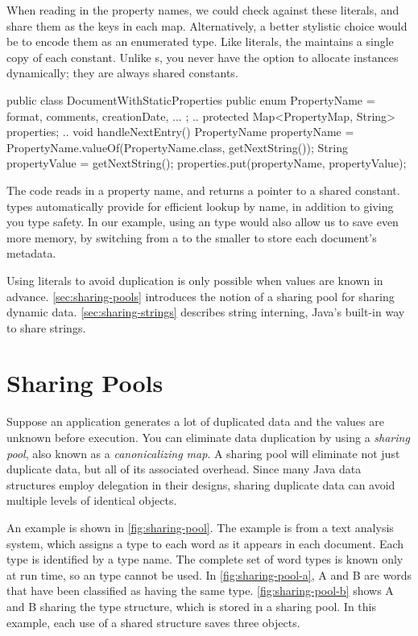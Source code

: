 When reading in the property names, we could check against these
literals, and share them as the keys in each map. 
Alternatively, a better stylistic choice would be to encode them as an
enumerated type. Like  literals, the \jre maintains a
single copy of each  constant. Unlike s,
you never have the option to allocate  instances dynamically; they
are always shared constants. 

\begin{shortlisting}
	public class DocumentWithStaticProperties {
		public enum PropertyName = 
			{format, comments, creationDate, ... };
		..
		protected Map<PropertyMap, String> properties; 
		..
		void handleNextEntry() {
			PropertyName propertyName = 
				PropertyName.valueOf(PropertyName.class, getNextString()); 
			String propertyValue = getNextString(); 
			properties.put(propertyName, propertyValue); }
	}
\end{shortlisting}

The code reads in a property name, and returns a pointer to a shared 
constant.  types automatically provide for
efficient lookup by name, in addition to giving you type safety. In our
example, using an  type would also allow us to save even more memory,
by switching from a  to the smaller  to store each document's metadata.

Using literals to avoid duplication is only possible when values are known in advance.
\autoref{sec:sharing-pools} introduces the notion of a sharing pool for
sharing dynamic data. \autoref{sec:sharing-strings} describes
string interning, Java's built-in way to share strings.

\section{Sharing Pools}
\label{sec:sharing-pools}

Suppose an application generates a lot of duplicated data and the values
are unknown before execution. 
You can eliminate data duplication by using a \emph{sharing pool}, also known
as a \emph{canonicalizing map}. 
A sharing pool will eliminate not just duplicate data, 
but all of its associated overhead. Since many Java data structures employ 
delegation in their designs, sharing duplicate data can avoid
multiple levels of identical objects.

An example is shown in \autoref{fig:sharing-pool}. The example is from a
text analysis system, which assigns a type to each word as it appears in each
document.  Each type is identified by a  type name.
The complete set of word types is known only at run time, so an 
 type cannot be used.  In \autoref{fig:sharing-pool-a},
A and B are words that have been classified as having the same type. 
\autoref{fig:sharing-pool-b} shows A and B sharing the type
structure, which is stored in a sharing pool. In this example, each use of a
shared structure saves three objects.

